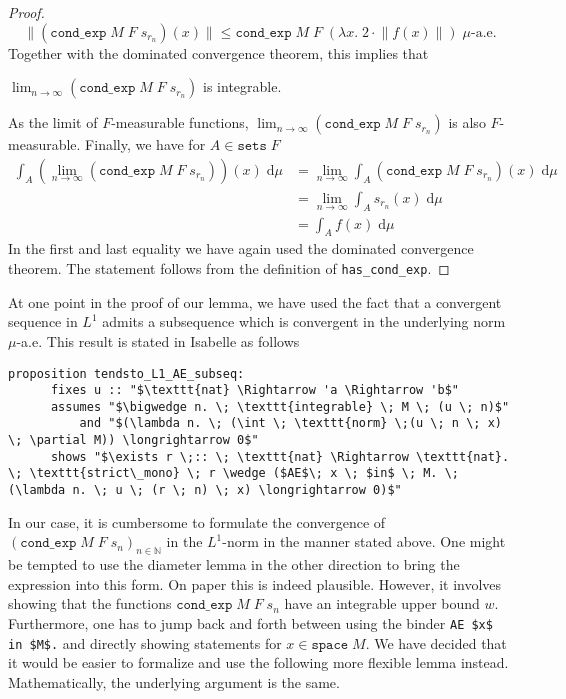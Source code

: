 \begin{proof}
	\[
		\lVert (\texttt{cond\_exp} \; M \; F \; s_{r_n}) (x) \rVert \le \texttt{cond\_exp} \; M \; F \; (\lambda x. \; 2 \cdot \lVert f(x)\rVert) \; \mu\textrm{-a.e.}
	\]
	Together with the dominated convergence theorem, this implies that \par\noindent$\lim_{n \to \infty} (\texttt{cond\_exp} \; M \; F \; s_{r_n})$ is integrable. \par\noindent As the limit of $F$-measurable functions, $\lim_{n \to \infty} (\texttt{cond\_exp} \; M \; F \; s_{r_n})$ is also $F$-measurable. Finally, we have for $A \in \texttt{sets} \; F$
	\begin{align*}
		\int_A (\lim_{n \to \infty} (\texttt{cond\_exp} \; M \; F \; s_{r_n}))(x) \; \textrm{d}\mu &= \lim_{n \to \infty} \int_A (\texttt{cond\_exp} \; M \; F \; s_{r_n})(x) \; \textrm{d}\mu \\
		&= \lim_{n \to \infty} \int_A s_{r_n}(x) \; \textrm{d}\mu \\
		&= \int_A f(x) \; \textrm{d}\mu 
	\end{align*}
	In the first and last equality we have again used the dominated convergence theorem. The statement follows from the definition of \texttt{has\_cond\_exp}.
\end{proof}

At one point in the proof of our lemma, we have used the fact that a convergent sequence in $L^1$ admits a subsequence which is convergent in the underlying norm $\mu$-a.e. This result is stated in Isabelle as follows

{\small
	\begin{lstlisting}[style=isabelle]
	proposition tendsto_L1_AE_subseq:
	  fixes u :: "$\texttt{nat} \Rightarrow 'a \Rightarrow 'b$"
	  assumes "$\bigwedge n. \; \texttt{integrable} \; M \; (u \; n)$"
		  and "$(\lambda n. \; (\int \; \texttt{norm} \;(u \; n \; x) \; \partial M)) \longrightarrow 0$"
	  shows "$\exists r \;:: \; \texttt{nat} \Rightarrow \texttt{nat}. \; \texttt{strict\_mono} \; r \wedge ($AE$\; x \; $in$ \; M. \; (\lambda n. \; u \; (r \; n) \; x) \longrightarrow 0)$"
	\end{lstlisting}
}

In our case, it is cumbersome to formulate the convergence of $(\texttt{cond\_exp} \; M \; F \; s_n)_{n \in \mathbb{N}}$ in the $L^1$-norm in the manner stated above. One might be tempted to use the diameter lemma in the other direction to bring the expression into this form. On paper this is indeed plausible. However, it involves showing that the functions $\texttt{cond\_exp} \; M \; F \; s_n$ have an integrable upper bound $w$. Furthermore, one has to jump back and forth between using the binder \lstinline[mathescape]{AE $x$ in $M$.} and directly showing statements for $x \in \texttt{space} \; M$. We have decided that it would be easier to formalize and use the following more flexible lemma instead. Mathematically, the underlying argument is the same.

